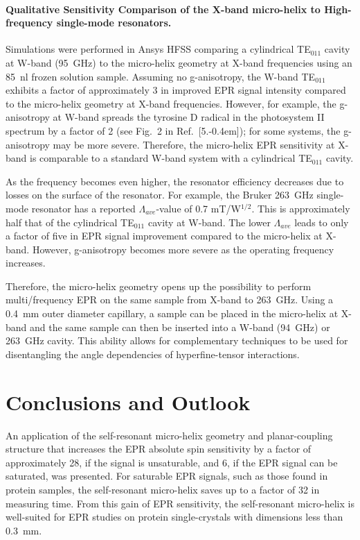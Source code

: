\paragraph{Qualitative Sensitivity Comparison of the X-band micro-helix to High-frequency single-mode resonators.}
Simulations were performed in Ansys HFSS comparing a cylindrical TE$_{011}$ cavity at W-band (95~GHz) to the micro-helix geometry at X-band frequencies using an 85~nl frozen solution sample. Assuming no g-anisotropy, the W-band TE$_{011}$ exhibits a factor of approximately 3 in improved EPR signal intensity compared to the micro-helix geometry at X-band frequencies. However, for example, the g-anisotropy at W-band spreads the tyrosine D radical in the photosystem II spectrum by a factor of 2 (see Fig.~2 in Ref.~[5.\kern-0.4em]); for some systems, the g-anisotropy may be more severe. Therefore, the micro-helix EPR sensitivity at X-band is comparable to a standard W-band system with a cylindrical TE$_{011}$ cavity. 

As the frequency becomes even higher, the resonator efficiency decreases due to losses on the surface of the resonator. For example, the Bruker 263~GHz single-mode resonator has a reported $\Lambda_{ave}$-value of 0.7 mT/W$^{1/2}$. \cite{bruker263} This is approximately half that of the cylindrical TE$_{011}$ cavity at W-band. The lower $\Lambda_{ave}$ leads to only a factor of five in EPR signal improvement compared to the micro-helix at X-band. However, g-anisotropy becomes more severe as the operating frequency increases.

Therefore, the micro-helix geometry opens up the possibility to perform multi\-/frequency EPR on the same sample from X-band to 263~GHz. Using a 0.4~mm outer diameter capillary, a sample can be placed in the micro-helix at X-band and the same sample can then be inserted into a W-band (94~GHz) or 263~GHz cavity. This ability allows for complementary techniques to be used for disentangling the angle dependencies of hyperfine-tensor interactions.


\section{Conclusions and Outlook}
An application of the self-resonant micro-helix geometry and planar-coupling structure that increases the EPR absolute spin sensitivity by a factor of approximately 28, if the signal is unsaturable, and 6, if the EPR signal can be saturated, was presented. For saturable EPR signals, such as those found in protein samples, the self-resonant micro-helix saves up to a factor of 32 in measuring time. From this gain of EPR sensitivity, the self-resonant micro-helix is well-suited for EPR studies on protein single-crystals with dimensions less than 0.3~mm. 

